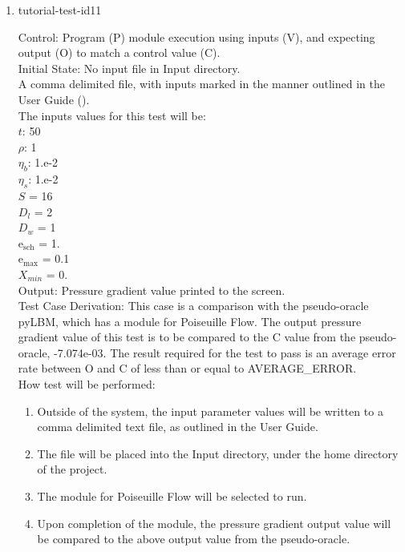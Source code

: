\documentclass[12pt, titlepage]{article}
\begin{document}
\begin{enumerate}

\item{tutorial-test-id11\\}

Control: Program (P) module execution using inputs (V), and expecting output (O) to match a control value (C).\\
					
Initial State: No input file in Input directory.\\
					
A comma delimited file, with inputs marked in the manner outlined in the User Guide (\citet{LBM_UserGuide_PM}).\\The inputs values for this test will be:\\
$t$: 50\\
$\rho$: 1\\
$\eta_b$: 1.e-2\\
$\eta_s$: 1.e-2\\
$S$ = 16\\
$D_{l}$ = 2\\
$D_{w}$ = 1\\
$\mathrm{e_{sch}}$ = 1.\\
$\mathrm{e_{max}}$ = 0.1\\
$X_{min}$ = 0.\\

					
Output: Pressure gradient value printed to the screen.  \\

Test Case Derivation: This case is a comparison with the pseudo-oracle pyLBM, which has a module for Poiseuille Flow. The output pressure gradient value of this test is to be compared to the C value from the pseudo-oracle, -7.074e-03. The result required for the test to pass is an average error rate between O and C of less than or equal to AVERAGE\_ERROR.\\

					
How test will be performed: 

\begin{enumerate}
\item Outside of the system, the input parameter values will be written to a comma delimited text file, as outlined in the User Guide.
\item The file will be placed into the Input directory, under the home directory of the project.
\item The module for Poiseuille Flow will be selected to run.
\item Upon completion of the module, the pressure gradient output value will be compared to the above output value from the pseudo-oracle.
\end{enumerate}			


\end{enumerate}
\end{document}
